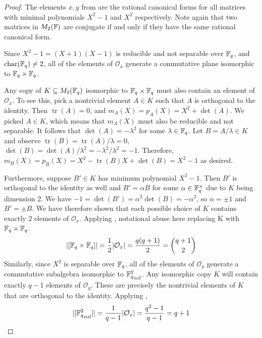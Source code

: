 \documentclass{amsart}
\begin{document}
\begin{proof}
    The elements $x, y$ from  are the rational canonical forms for all matrices with minimal polynomials $X^2 - 1$ and $X^2$ respectively. Note again that two matrices in $M_2(\protect\mathbb{F})$ are conjugate if and only if they have the same rational canonical form.

    Since $X^2 - 1 = (X + 1)(X - 1)$ is reducible and not separable over $\protect\mathbb{F}_q$, and $\operatorname{char}(\protect\mathbb{F}_q) \neq 2$, all of the elements of $\mathcal{O}_x$ generate a commutative plane isomorphic to $\protect\mathbb{F}_q \times \protect\mathbb{F}_q$.

    Any copy of $K \subseteq M_2(\protect\mathbb{F}_q)$ isomorphic to $\protect\mathbb{F}_q \times \protect\mathbb{F}_q$ must also contain an element of $\mathcal{O}_x$. To see this, pick a nontrivial element $A \in K$ such that $A$ is orthogonal to the identity. Then $\operatorname{tr}(A) = 0$, and $m_A(X) = p_A(X) = X^2 + \det(A)$. We picked $A \in K$, which means that $m_A(X)$ must also be reducible and not separable. It follows that $\det(A) = -\lambda^2$ for some $\lambda \in \protect\mathbb{F}_q$. Let $B = A/\lambda \in K$ and observe $\operatorname{tr}(B) = \operatorname{tr}(A)/\lambda = 0$, $\det(B) = \det(A)/\lambda^2 = -\lambda^2/\lambda^2 = -1$. Therefore, $m_B(X) = p_B(X) = X^2 -\operatorname{tr}(B) X + \det(B) = X^2 -1$ as desired.

    Furthermore, suppose $B' \in K$ has minimum polynomial $X^2 - 1$. Then $B'$ is orthogonal to the identity as well and $B' = \alpha B$ for some $\alpha \in \protect\mathbb{F}_q^{\times}$ due to $K$ being dimension $2$. We have $-1 = \det(B') = \alpha^2 \det(B) = -\alpha^2$, so $\alpha = \pm 1$ and $B' = \pm B$. We have therefore shown that each possible choice of $K$ contains exactly $2$ elements of $\mathcal{O}_x$. Applying ,
    {\color{blue} notational abuse here replacing K with $\protect\mathbb{F}_q \times \protect\mathbb{F}_q$}. 
    \begin{align*}
        |[\protect\mathbb{F}_q \times \protect\mathbb{F}_q]| = \frac{1}{2}|\mathcal{O}_x|
                  = \frac{q(q+1)}{2}
                  = \binom{q + 1}{2}
    \end{align*}
    Similarly, since $X^2$ is separable over $\protect\mathbb{F}_q$, all of the elements of $\mathcal{O}_y$ generate a commutative subalgebra isomorphic to ${\protect\mathbb{F}_q^2}_{nil}$. Any isomorphic copy $K$ will contain exactly $q - 1$ elements of $\mathcal{O}_y$. These are precisely the nontrivial elements of $K$ that are orthogonal to the identity. Applying ,
    \begin{align*}
        |[{\protect\mathbb{F}_q^2}_{nil}]| = \frac{1}{q-1}|\mathcal{O}_x|
                            = \frac{q^2-1}{q-1}
                            = q+1
    \end{align*}


\end{proof}
\end{document}
